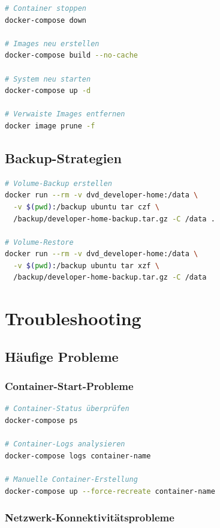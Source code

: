 \documentclass[11pt,a4paper]{article}
\begin{document}
\begin{lstlisting}[language=bash, caption=System-Updates]
# Container stoppen
docker-compose down

# Images neu erstellen
docker-compose build --no-cache

# System neu starten
docker-compose up -d

# Verwaiste Images entfernen
docker image prune -f
\end{lstlisting}

\subsection{Backup-Strategien}

\begin{lstlisting}[language=bash, caption=Volume-Backup]
# Volume-Backup erstellen
docker run --rm -v dvd_developer-home:/data \
  -v $(pwd):/backup ubuntu tar czf \
  /backup/developer-home-backup.tar.gz -C /data .

# Volume-Restore
docker run --rm -v dvd_developer-home:/data \
  -v $(pwd):/backup ubuntu tar xzf \
  /backup/developer-home-backup.tar.gz -C /data
\end{lstlisting}

\section{Troubleshooting}

\subsection{Häufige Probleme}

\subsubsection{Container-Start-Probleme}

\begin{lstlisting}[language=bash, caption=Container-Debugging]
# Container-Status überprüfen
docker-compose ps

# Container-Logs analysieren
docker-compose logs container-name

# Manuelle Container-Erstellung
docker-compose up --force-recreate container-name
\end{lstlisting}

\subsubsection{Netzwerk-Konnektivitätsprobleme}
\end{document}
